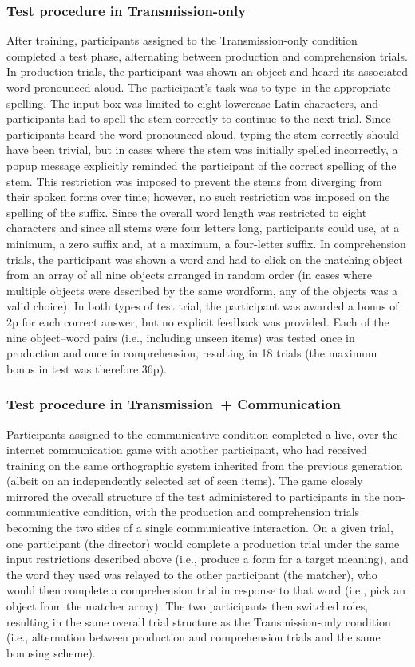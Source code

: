 \documentclass[doc,biblatex]{apa7}
\begin{document}
\subsubsection{Test procedure in Transmission-only}

After training, participants assigned to the Transmission-only condition completed a test phase, alternating between production and comprehension trials. In production trials, the participant was shown an object and heard its associated word pronounced aloud. The participant's task was to type~in the appropriate spelling. The input box was limited to eight lowercase Latin characters, and participants had to spell the stem correctly to continue to the next trial. Since participants heard the word pronounced aloud, typing the stem correctly should have been trivial, but in cases where the stem was initially spelled incorrectly, a popup message explicitly reminded the participant of the correct spelling of the stem. This restriction was imposed to prevent the stems from diverging from their spoken forms over time; however, no such restriction was imposed on the spelling of the suffix. Since the overall word length was restricted to eight characters and since all stems were four letters long, participants could use, at a minimum, a zero suffix and, at a maximum, a four-letter suffix. In comprehension trials, the participant was shown a word and had to click on the matching object from an array of all nine objects arranged in random order (in cases where multiple objects were described by the same wordform, any of the objects was a valid choice). In both types of test trial, the participant was awarded a bonus of 2p for each correct answer, but no explicit feedback was provided. Each of the nine object--word pairs (i.e., including unseen items) was tested once in production and once in comprehension, resulting in 18 trials (the maximum bonus in test was therefore 36p).

\subsubsection{Test procedure in Transmission~+ Communication}

Participants assigned to the communicative condition completed a live, over-the-internet communication game with another participant, who had received training on the same orthographic system inherited from the previous generation (albeit on an independently selected set of seen items). The game closely mirrored the overall structure of the test administered to participants in the non-communicative condition, with the production and comprehension trials becoming the two sides of a single communicative interaction. On a given trial, one participant (the director) would complete a production trial under the same input restrictions described above (i.e., produce a form for a target meaning), and the word they used was relayed to the other participant (the matcher), who would then complete a comprehension trial in response to that word (i.e., pick an object from the matcher array). The two participants then switched roles, resulting in the same overall trial structure as the Transmission-only condition (i.e., alternation between production and comprehension trials and the same bonusing scheme).
\end{document}

